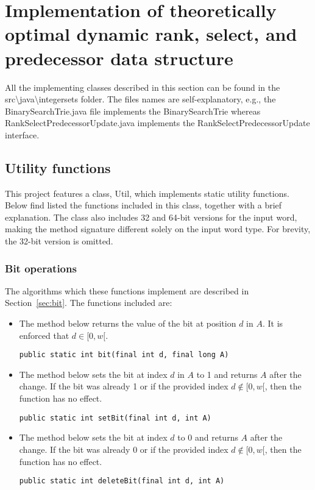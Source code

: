\chapter{Implementation of theoretically optimal dynamic rank, select, and predecessor data structure}


All the implementing classes described in this section can be found in the {\ttfamily src\textbackslash java\textbackslash integersets} folder. The files names are self-explanatory, e.g., the {\ttfamily BinarySearchTrie.java} file implements the {\ttfamily BinarySearchTrie} whereas {\ttfamily RankSelectPredecessorUpdate.java} implements the {\ttfamily RankSelectPredecessorUpdate} interface.

\section{Utility functions}

This project features a class, {\ttfamily Util}, which implements static utility functions. Below find listed the functions included in this class, together with a brief explanation. The class also includes 32 and 64-bit versions for the input word, making the method signature different solely on the input word type.
For brevity, the 32-bit version is omitted.

\subsection{Bit operations}
The algorithms which these functions implement are described in Section~\ref{sec:bit}.
The functions included are:

\begin{itemize}
    \item
    The method below returns the value of the bit at position $d$ in $A$. It is enforced that $d \in [0, w[$.
    \begin{lstlisting}
public static int bit(final int d, final long A)
    \end{lstlisting}
    
    \item
    The method below sets the bit at index $d$ in $A$ to 1 and returns $A$ after the change. If the bit was already 1 or if the provided index $d \not\in [0, w[$, then the function has no effect.
    \begin{lstlisting}
public static int setBit(final int d, int A)
    \end{lstlisting}
    
    \item
    The method below sets the bit at index $d$ to 0 and returns $A$ after the change. If the bit was already 0 or if the provided index $d \not\in [0, w[$, then the function has no effect.
    \begin{lstlisting}
public static int deleteBit(final int d, int A)
    \end{lstlisting}
\end{itemize}


